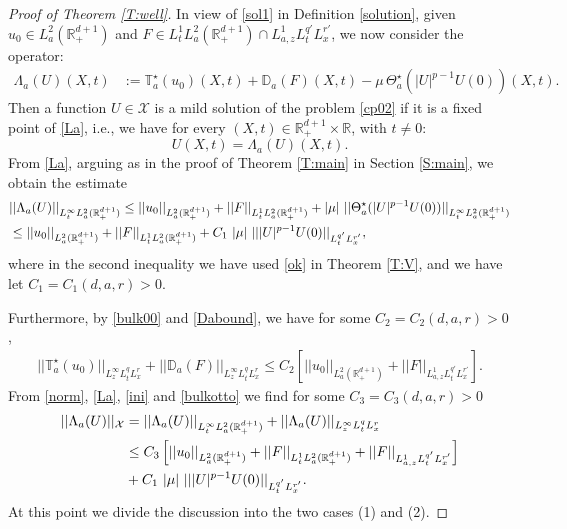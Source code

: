 \documentclass[10pt,a4paper]{amsart}
\def \R {\mathbb{R}}
\def \RN {\mathbb{R}_+^{d+1}}
\newcommand{\Xs}{\mathcal X}
\begin{document}
\begin{proof}[Proof of Theorem \ref{T:well}]
In view of \eqref{sol1} in Definition \ref{solution}, given $u_0\in L^2_a(\RN)$ and $F\in L^1_t L^2_a(\RN) \cap L^1_{a,z} L_t^{q'} L^{r'}_x$, we now consider the operator: 
\begin{align}\label{La}
\Lambda_a(U)(X,t) & := \mathbb T_a^\star(u_0)(X,t) + \mathbb D_a(F)(X,t) - \mu\, \Theta_a^\star(|U|^{p-1} U(0))(X,t).
\end{align}
Then a function $U\in \Xs$ is a mild solution of the problem \eqref{cp02} if it is a fixed point of \eqref{La}, i.e., we have for every $(X,t)\in \RN\times \R$, with $t\not= 0$:
\begin{equation}\label{LaU}
U(X,t) = \Lambda_a(U)(X,t).
\end{equation}
From \eqref{La}, arguing as in the proof of Theorem \ref{T:main} in Section \ref{S:main}, we obtain the estimate  
\begin{align}\label{ini}
& ||\Lambda_a(U)||_{L^\infty_t L^2_a(\RN)} \le ||u_0||_{L^2_a(\RN)} + ||F||_{L^1_t L^2_a(\RN)}  + |\mu|\ ||\Theta^\star_a(|U|^{p-1}U(0))||_{L^\infty_t L^2_a(\RN)}
\\
& \le ||u_0||_{L^2_a(\RN)} + ||F||_{L^1_t L^2_a(\RN)}  + C_1\ |\mu|\ |||U|^{p-1}U(0)||_{L^{q'}_t L^{r'}_x},
\notag
\end{align}
where in the second inequality we have used \eqref{ok} in Theorem \ref{T:V}, and we have let $C_1 = C_1(d,a,r)>0$. 

Furthermore, by \eqref{bulk00}  and \eqref{Dabound}, we have for some $C_2 = C_2(d,a,r)>0$,
\begin{align}\label{bulkotto}
||\mathbb T^\star_a(u_0)||_{L^\infty_z L^q_t L^r_x} + ||\mathbb D_a(F)||_{L^\infty_z L^q_t L^r_x}\le C_2 \left[||u_0||_{L^2_a(\RN)} + ||F||_{L^1_{a,z} L^{q'}_t L^{r'}_x}\right].
\end{align}
From \eqref{norm}, \eqref{La}, \eqref{ini} and \eqref{bulkotto} we find for some $C_3 = C_3(d,a,r)>0$
\begin{align}\label{stelle1}
||\Lambda_a(U)||_{\Xs} & = ||\Lambda_a(U)||_{L^\infty_t L^2_a(\RN)} + ||\Lambda_a(U)||_{L^\infty_z L^q_t L^r_x}
\\
& \le C_3 \left[||u_0||_{L^2_a(\RN)} + ||F||_{L^1_t L^2_a(\RN)} + ||F||_{L^1_{a,z} L^{q'}_t L^{r'}_x}\right]
\notag
\\
& +  C_1\ |\mu|\ |||U|^{p-1}U(0)||_{L^{q'}_t L^{r'}_x}.
\notag
\end{align}
At this point we divide the discussion into the two cases (1) and (2). 

\medskip 


\end{proof}
\end{document}
